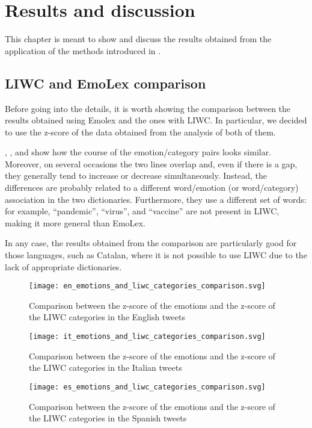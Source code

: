 \graphicspath{{chapters/chapter4/img/}}

\chapter{Results and discussion}
\label{cha:results}

This chapter is meant to show and discuss the results obtained from the application of the methods introduced in .

\section{LIWC and EmoLex comparison}
\label{sec:comparison}

Before going into the details, it is worth showing the comparison between the results obtained using Emolex and the ones with LIWC. In particular, we decided to use the z-score of the data obtained from the analysis of both of them.

, , and  show how the course of the emotion/category pairs looks similar. Moreover, on several occasions the two lines overlap and, even if there is a gap, they generally tend to increase or decrease simultaneously. Instead, the differences are probably related to a different word/emotion (or word/category) association in the two dictionaries. Furthermore, they use a different set of words: for example, “pandemic”, “virus”, and “vaccine” are not present in LIWC, making it more general than EmoLex.

In any case, the results obtained from the comparison are particularly good for those languages, such as Catalan, where it is not possible to use LIWC due to the lack of appropriate dictionaries.

\begin{figure}[H]
	\centering
    	\texttt{[image: en\_emotions\_and\_liwc\_categories\_comparison.svg]}
    	\caption{Comparison between the z-score of the emotions and the z-score of the LIWC categories in the English tweets}
    	\label{fig:en-emotions-liwc-comparison}
    	
    	\vspace{.5cm}
    	
    	\texttt{[image: it\_emotions\_and\_liwc\_categories\_comparison.svg]}
    	\caption{Comparison between the z-score of the emotions and the z-score of the LIWC categories in the Italian tweets}
    	\label{fig:it-emotions-liwc-comparison}
    	
    	\vspace{.5cm}
    	
    	\texttt{[image: es\_emotions\_and\_liwc\_categories\_comparison.svg]}
    	\caption{Comparison between the z-score of the emotions and the z-score of the LIWC categories in the Spanish tweets}
    	\label{fig:es-emotions-liwc-comparison}
\end{figure}

